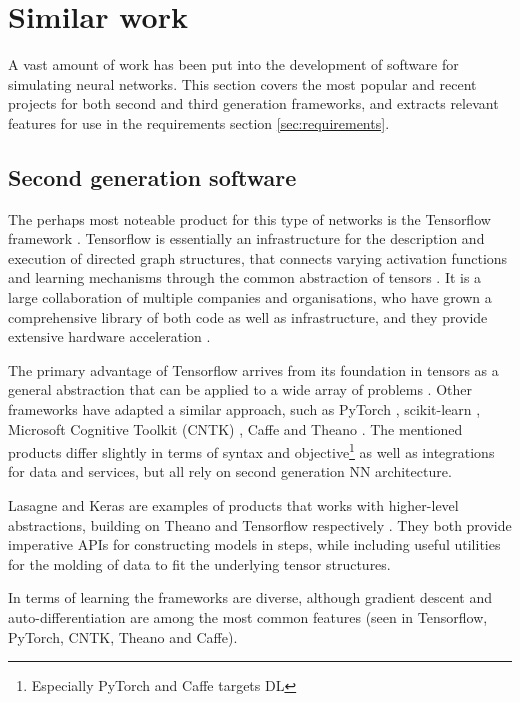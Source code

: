 \documentclass[report.tex]{subfiles}
\begin{document}
\section{Similar work}
A vast amount of work has been put into the development of software for simulating
neural networks.
This section covers the most popular and recent projects for both second and third
generation frameworks, and extracts relevant
features for use in the requirements section \ref{sec:requirements}.

\subsection{Second generation software}
The perhaps most noteable product for this type of networks is the Tensorflow 
framework \cite{Abadi2016}.
Tensorflow is essentially an infrastructure for the description and execution of directed graph 
structures,
that connects varying activation functions and learning mechanisms through the common abstraction
of tensors \cite{Abadi2015}.
It is a large collaboration of multiple companies and organisations, who have
grown a comprehensive library of both code as well as infrastructure, and they
provide extensive hardware acceleration \cite{Abadi2015}.

The primary advantage of Tensorflow  arrives from 
its foundation in tensors as a general abstraction that
can be applied to a wide array of problems \cite{Abadi2016}.
Other frameworks have adapted a similar approach, such as PyTorch \cite{PyTorch2018}, 
scikit-learn \cite{Sklearn2018}, Microsoft Cognitive Toolkit (CNTK) \cite{CNTK2018},
Caffe \cite{Caffe2018} and Theano \cite{Theano2018}.
The mentioned products differ slightly in terms of syntax and objective\footnote{Especially
PyTorch and Caffe targets \gls{DL}} as well as integrations for data and services, but
all rely on second generation \gls{NN} architecture.

Lasagne and Keras are examples of products that works with higher-level abstractions,
building on Theano and Tensorflow respectively \cite{Lasagne2018, Keras2018}.
They both provide imperative \gls{API}s for constructing models in steps, while
including useful utilities for the molding of data to fit the underlying tensor structures.

In terms of learning the frameworks are diverse, although gradient descent 
and auto-differentiation are among the most common features 
(seen in Tensorflow, PyTorch, CNTK, Theano
and Caffe). 
\end{document}
